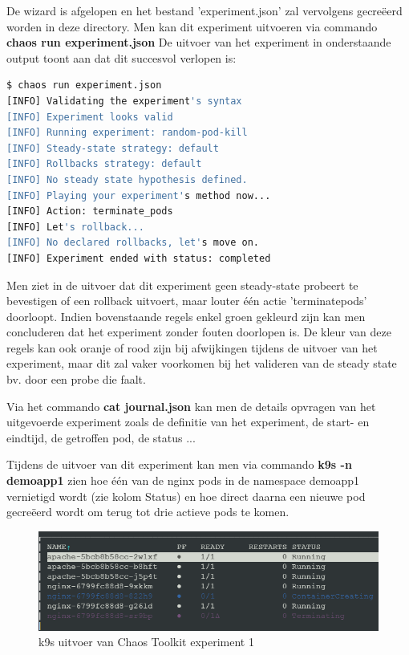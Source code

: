 De wizard is afgelopen en het bestand 'experiment.json' zal vervolgens gecreëerd worden in deze directory. Men kan dit experiment uitvoeren via commando {\bf chaos run experiment.json}
De uitvoer van het experiment in onderstaande output toont aan dat dit succesvol verlopen is:
\begin{lstlisting}[language=bash]
$ chaos run experiment.json
[INFO] Validating the experiment's syntax
[INFO] Experiment looks valid
[INFO] Running experiment: random-pod-kill
[INFO] Steady-state strategy: default
[INFO] Rollbacks strategy: default
[INFO] No steady state hypothesis defined. 
[INFO] Playing your experiment's method now...
[INFO] Action: terminate_pods
[INFO] Let's rollback...
[INFO] No declared rollbacks, let's move on.
[INFO] Experiment ended with status: completed

\end{lstlisting}

Men ziet in de uitvoer dat dit experiment geen steady-state probeert te bevestigen of een rollback uitvoert, maar louter één actie 'terminate\textunderscore pods' doorloopt.
Indien bovenstaande regels enkel groen gekleurd zijn kan men concluderen dat het experiment zonder fouten doorlopen is. De kleur van deze regels kan ook oranje of rood zijn bij afwijkingen tijdens de uitvoer van het experiment, maar dit zal vaker voorkomen bij het valideren van de steady state bv. door een probe die faalt.  
 
Via het commando {\bf cat journal.json} kan men de details opvragen van het uitgevoerde experiment zoals de definitie van het experiment, de start- en eindtijd, de getroffen pod, de status ... 

Tijdens de uitvoer van dit experiment kan men via commando {\bf k9s -n demoapp1} zien hoe één van de nginx pods in de namespace demoapp1 vernietigd wordt (zie kolom Status) en hoe direct daarna een nieuwe pod gecreëerd wordt om terug tot drie actieve pods te komen. 

\begin{figure}[h]
    \centering
    \includegraphics{img/k9s-chaostoolkit-ex1.png}
    \caption{k9s uitvoer van Chaos Toolkit experiment 1}
    \label{img:chaostoolkitexperiment1}
\end{figure}

